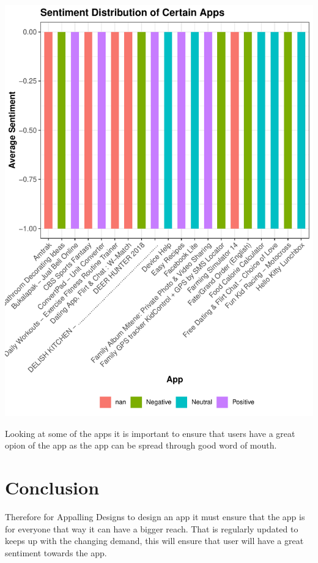\documentclass[11pt,preprint, authoryear]{elsarticle}
\let\origfigure\figure
\let\endorigfigure\endfigure
\renewenvironment{figure}[1][2] {
    \expandafter\origfigure\expandafter[H]
} {
    \endorigfigure
}
\numberwithin{equation}{section}
\numberwithin{figure}{section}
\numberwithin{table}{section}
\begin{document}
\begin{figure}[H]

{\centering \includegraphics{Q5_files/figure-latex/Figure6-1} 

}

\caption{App Sentiment   \label{Figure6}}\label{fig:Figure6}
\end{figure}

Looking at some of the apps it is important to ensure that users have a
great opion of the app as the app can be spread through good word of
mouth.

\hypertarget{conclusion}{%
\section{Conclusion}\label{conclusion}}

Therefore for Appalling Designs to design an app it must ensure that the
app is for everyone that way it can have a bigger reach. That is
regularly updated to keeps up with the changing demand, this will ensure
that user will have a great sentiment towards the app.


\end{document}

